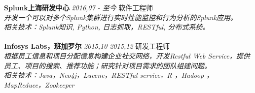 \documentclass{resume}
\newcommand\fs{\CJKfamily{fs}}
\newcommand{\sanhao}{\fontsize{16pt}{\baselineskip}\selectfont}
\newcommand{\sihao}{\fontsize{14pt}{\baselineskip}\selectfont}
\begin{document}
\begin{rSection}{\fs \sanhao {实习经历}}
	\sihao \textbf{Splunk上海研发中心}  \hfill {\em 2016,07 - 至今}{ 软件工程师}{}\\
	\sihao \textit{    
		开发一个可以对多个Splunk集群进行实时性能监控和行为分析的Splunk应用。}\\
	\sihao \textit{    相关技术：Splunk知识, Python, 日志抓取，RESTful, 分布式系统。}\\
	\\
	\sihao \textbf{Infosys Labs，班加罗尔}  \hfill {\em 2015,10-2015,12}{ 研发工程师}{}\\
	\sihao \textit{    根据员工信息和项目分配信息构建企业社交网络，开发Restful Web Service，提供员工、项目的搜索、推荐功能；研究针对项目需求的团队组建问题。}\\
	\sihao \textit{    相关技术：Java，Neo4j，Lucene，RESTful service，R ，Hadoop ，MapReduce，Zookeeper}
	\\
\end{rSection}
\end{document}

